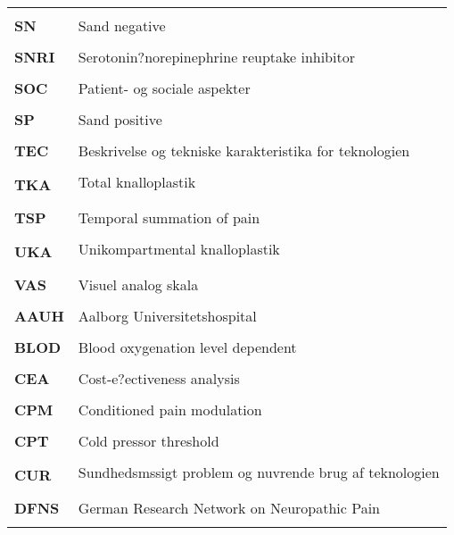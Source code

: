 \begin{longtable}{p{}  p{}}
\\ \\
\textbf{SN}  & Sand negative                                            
\\ \\
\textbf{SNRI}& Serotonin?norepinephrine reuptake inhibitor              
\\ \\
\textbf{SOC} & Patient- og sociale aspekter                             
\\ \\
\textbf{SP}  & Sand positive                                            
\\ \\
\textbf{TEC} & Beskrivelse og tekniske karakteristika for teknologien   
\\ \\
\textbf{TKA} & Total knalloplastik                                     
\\ \\
\textbf{TSP} & Temporal summation of pain                               
\\ \\
\textbf{UKA} & Unikompartmental knalloplastik                          
\\ \\
\textbf{VAS} & Visuel analog skala                                      
\\ \\
\textbf{AAUH}& Aalborg Universitetshospital                             
\\ \\
\textbf{BLOD}& Blood oxygenation level dependent                        
\\ \\
\textbf{CEA} & Cost-e?ectiveness analysis                               
\\ \\
\textbf{CPM} & Conditioned pain modulation                              
\\ \\
\textbf{CPT} & Cold pressor threshold                                   
\\ \\
\textbf{CUR} & Sundhedsmssigt problem og nuvrende brug af teknologien 
\\ \\
\textbf{DFNS}& German Research Network on Neuropathic Pain              
\\ \\

\end{longtable}
